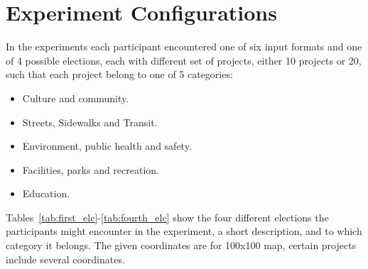 \documentclass[letterpaper]{article} %
\begin{document}
\section{Experiment Configurations}\label{app:elections}

In the experiments each participant encountered one of six input formats and one of 4 possible elections, each with different set of projects, either 10 projects or 20, such that each project belong to one of 5 categories:

\begin{itemize}
    \item Culture and community.
    \item Streets, Sidewalks and Transit.
    \item Environment, public health and safety.
    \item Facilities, parks and recreation.
    \item Education.
\end{itemize}

Tables~\ref{tab:first_elc}-\ref{tab:fourth_elc} show the four different elections the participants might encounter in the experiment, a short description, and to which category it belongs. The given coordinates are for 100x100 map, certain projects include several coordinates.
\end{document}
